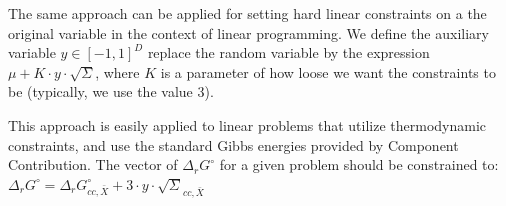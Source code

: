 \documentclass{article}
\begin{document}
The same approach can be applied for setting hard linear constraints on a the original variable in the context of linear programming. We define the auxiliary variable $y \in [-1, 1]^D$ replace the random variable by the expression $\mu + K \cdot y \cdot \sqrt{\Sigma}$, where $K$ is a parameter of how loose we want the constraints to be (typically, we use the value $3$).

This approach is easily applied to linear problems that utilize thermodynamic constraints, and use the standard Gibbs energies provided by Component Contribution. The vector of $\Delta_{r}G^{\circ}$ for a given problem should be constrained to:
$\Delta_{r}G^{\circ} = \Delta_{r}G_{cc,\bar{X}}^{\circ} + 3 \cdot y \cdot \sqrt{\Sigma}_{cc,\bar{X}}$
\end{document}
